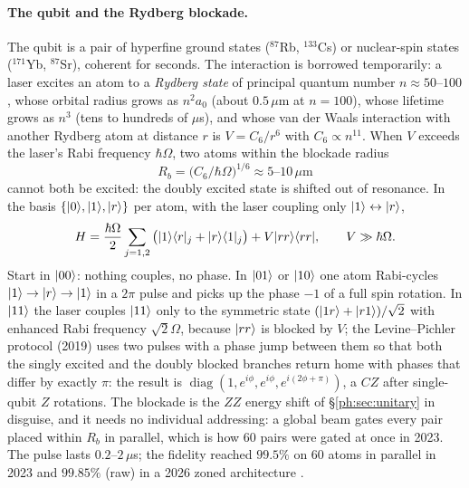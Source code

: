 \paragraph{The qubit and the Rydberg blockade.} The qubit is a pair of hyperfine ground states
($^{87}$Rb, $^{133}$Cs) or nuclear-spin states ($^{171}$Yb, $^{87}$Sr), coherent for seconds.
The interaction is borrowed temporarily: a laser excites an atom to a \emph{Rydberg state} of
principal quantum number $n\approx50$--$100$, whose orbital radius grows as $n^2a_0$ (about
$0.5\,\mu$m at $n=100$), whose lifetime grows as $n^3$ (tens to hundreds of $\mu$s), and whose
van der Waals interaction with another Rydberg atom at distance $r$ is $V=C_6/r^6$ with
$C_6\propto n^{11}$. When $V$ exceeds the laser's Rabi frequency $\hbar\Omega$, two atoms within
the blockade radius
\[ R_b=\big(C_6/\hbar\Omega\big)^{1/6}\approx5\text{--}10\,\mu\text{m} \]
cannot both be excited: the doubly excited state is shifted out of resonance. In the basis $\{\lvert 0 \rangle,\lvert 1 \rangle,\lvert r \rangle\}$ per atom, with the laser coupling only
$\lvert 1 \rangle\leftrightarrow\lvert r \rangle$,
\[ H=\frac{\hbar\Omega}2\sum_{j=1,2}\big(\lvert 1 \rangle\langle r \rvert_j+\lvert r \rangle\langle 1 \rvert_j\big)+V\lvert rr \rangle\langle rr \rvert,\qquad V\gg\hbar\Omega . \]
Start in $\lvert 00 \rangle$: nothing couples, no phase. In $\lvert 01 \rangle$ or $\lvert 10 \rangle$ one atom Rabi-cycles
$\lvert 1 \rangle\to\lvert r \rangle\to\lvert 1 \rangle$ in a $2\pi$ pulse and picks up the phase $-1$ of a full spin rotation.
In $\lvert 11 \rangle$ the laser couples $\lvert 11 \rangle$ only to the symmetric state
$(\lvert 1r \rangle+\lvert r1 \rangle)/\sqrt2$ with enhanced Rabi frequency $\sqrt2\Omega$, because $\lvert rr \rangle$ is
blocked by $V$; the Levine--Pichler protocol (2019) uses two pulses with a phase jump between
them so that both the singly excited and the doubly blocked branches return home with phases
that differ by exactly $\pi$: the result is $\operatorname{diag}(1,e^{i\phi},e^{i\phi},e^{i(2\phi+\pi)})$,
a $CZ$ after single-qubit $Z$ rotations. The blockade is the $ZZ$ energy shift of
\S\ref{ph:sec:unitary} in disguise, and it needs no individual addressing: a global beam gates
every pair placed within $R_b$ in parallel, which is how 60 pairs were gated at once in 2023. The pulse lasts $0.2$--$2\,\mu$s; the fidelity reached $99.5\%$ on 60
atoms in parallel in 2023 and $99.85\%$ (raw) in a 2026 zoned architecture \cite{ph:uqt26,ph:evered23}.

